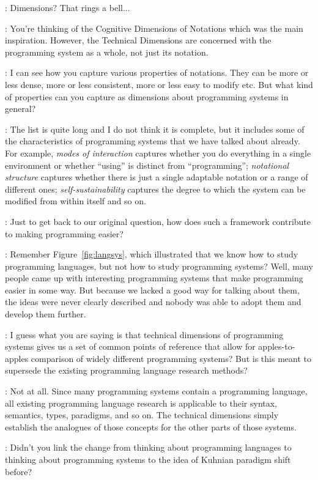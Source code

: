 \documentclass[runningheads]{llncs}
\newcommand{\T}{Tomas}
\newcommand{\J}{Joel}
\newcommand{\says}[2][gg]{\vspace{0.5em}\noindent\hangindent=0.5cm{\textsc{#1}}: #2}
\begin{document}
\says[\T]{Dimensions? That rings a bell...}

\says[\J]{You're thinking of the Cognitive Dimensions of Notations \cite{green-1990-cogdims} which was the main inspiration. However, the Technical Dimensions are concerned with the programming system as a whole, not just its notation.}

\says[\T]{I can see how you capture various properties of notations. They can be more or less
  dense, more or less consistent, more or less easy to modify etc. But what kind of properties
  can you capture as dimensions about programming systems in general?}

\says[\J]{The list is quite long and I do not think it is complete, but it includes some of the
  characteristics of programming systems that we have talked about already. For example,
  \emph{modes of interaction} captures whether you do everything in a single environment or
  whether ``using'' is distinct from ``programming''; \emph{notational structure} captures whether
  there is just a single adaptable notation or a range of different ones; \emph{self-sustainability}
  captures the degree to which the system can be modified from within itself and so on.}

\says[\T]{Just to get back to our original question, how does such a framework contribute to making programming easier?}

\says[\J]{Remember Figure~\ref{fig:langsys}, which illustrated that we know how to study programming languages, but not how to study programming systems? Well, many people came up with interesting programming systems that make programming easier in some way. But because we lacked a good way for talking about them, the ideas were never clearly described and nobody was able to adopt them and develop them further.}

\says[\T]{I guess what you are saying is that technical dimensions of programming systems gives us a set of common points of reference that allow for apples-to-apples comparison of widely different programming systems? But is this meant to supersede the existing programming language research methods?}

\says[\J]{Not at all. Since many programming systems contain a programming language, all existing programming language research is applicable to their syntax, semantics, types, paradigms, and so on. The technical dimensions simply establish the analogues of those concepts for the other parts of those systems.}

\says[\T]{Didn't you link the change from thinking about programming languages to thinking about programming systems to the idea of Kuhnian paradigm shift before?}
\end{document}

